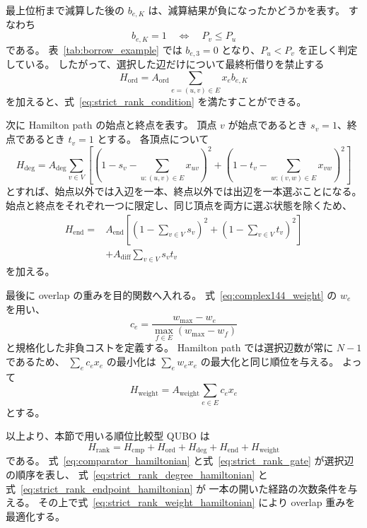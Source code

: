 \documentclass[a4j,10pt]{ujarticle}
\begin{document}
最上位桁まで減算した後の $b_{e,K}$ は、減算結果が負になったかどうかを表す。
すなわち
\begin{equation}
b_{e,K}=1
\quad\Longleftrightarrow\quad
P_v\leq P_u
\label{eq:final_borrow_order}
\end{equation}
である。
表~\ref{tab:borrow_example} では $b_{e,3}=0$ となり、$P_u<P_v$ を正しく判定している。
したがって、選択した辺だけについて最終桁借りを禁止する
\begin{equation}
H_{\mathrm{ord}}
=
A_{\mathrm{ord}}
\sum_{e=(u,v)\in E}
x_e b_{e,K}
\label{eq:strict_rank_gate}
\end{equation}
を加えると、式~\eqref{eq:strict_rank_condition} を満たすことができる。

次に Hamilton path の始点と終点を表す。
頂点 $v$ が始点であるとき $s_v=1$、終点であるとき $t_v=1$ とする。
各頂点について
\begin{equation}
H_{\mathrm{deg}}
=
A_{\mathrm{deg}}
\sum_{v\in V}
\left[
\left(
1-s_v-\sum_{u:(u,v)\in E}x_{uv}
\right)^2
+
\left(
1-t_v-\sum_{w:(v,w)\in E}x_{vw}
\right)^2
\right]
\label{eq:strict_rank_degree_hamiltonian}
\end{equation}
とすれば、始点以外では入辺を一本、終点以外では出辺を一本選ぶことになる。
始点と終点をそれぞれ一つに限定し、同じ頂点を両方に選ぶ状態を除くため、
\begin{equation}
\begin{aligned}
H_{\mathrm{end}}
={}&
A_{\mathrm{end}}
\left[
\left(1-\sum_{v\in V}s_v\right)^2
+
\left(1-\sum_{v\in V}t_v\right)^2
\right]
\\
&+
A_{\mathrm{diff}}
\sum_{v\in V}s_vt_v
\end{aligned}
\label{eq:strict_rank_endpoint_hamiltonian}
\end{equation}
を加える。

最後に overlap の重みを目的関数へ入れる。
式~\eqref{eq:complex144_weight} の $w_e$ を用い、
\begin{equation}
c_e
=
\frac{w_{\max}-w_e}
{\max_{f\in E}(w_{\max}-w_f)}
\label{eq:strict_rank_edge_cost}
\end{equation}
と規格化した非負コストを定義する。
Hamilton path では選択辺数が常に $N-1$ であるため、
$\sum_e c_ex_e$ の最小化は $\sum_e w_ex_e$ の最大化と同じ順位を与える。
よって
\begin{equation}
H_{\mathrm{weight}}
=
A_{\mathrm{weight}}
\sum_{e\in E}c_ex_e
\label{eq:strict_rank_weight_hamiltonian}
\end{equation}
とする。

以上より、本節で用いる順位比較型 QUBO は
\begin{equation}
H_{\mathrm{rank}}
=
H_{\mathrm{cmp}}
+
H_{\mathrm{ord}}
+
H_{\mathrm{deg}}
+
H_{\mathrm{end}}
+
H_{\mathrm{weight}}
\label{eq:strict_rank_total}
\end{equation}
である。
式~\eqref{eq:comparator_hamiltonian} と式~\eqref{eq:strict_rank_gate} が選択辺の順序を表し、
式~\eqref{eq:strict_rank_degree_hamiltonian} と式~\eqref{eq:strict_rank_endpoint_hamiltonian} が
一本の開いた経路の次数条件を与える。
その上で式~\eqref{eq:strict_rank_weight_hamiltonian} により overlap 重みを最適化する。
\end{document}
